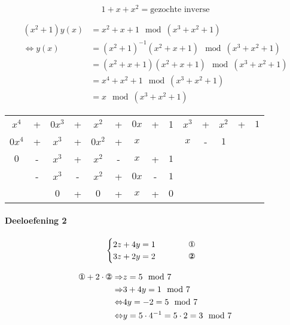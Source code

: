 \documentclass[12pt]{article}
\begin{document}
	\begin{equation}
		1+x+x^{2} = \text{gezochte inverse} 
	\end{equation}

	\begin{align}
	(x^{2}+1)y(x) &= x^{2}+x+1 \mod(x^{3}+x^{2}+1) \\
	\Leftrightarrow y(x) &= (x^{2}+1)^{-1} (x^{2}+x+1) \mod(x^{3}+x^{2}+1) \\
	&= (x^{2}+x+1)(x^{2}+x+1) \mod(x^{3}+x^{2}+1) \\
	&= x^{4}+x^{2}+1 \mod(x^{3}+x^{2}+1) \\
	&= x \mod(x^{3}+x^{2}+1)
	\end{align}

	\begin{table}[H]
	\centering
	\begin{tabular}{ccccccccc|ccccc}
		$x^{4}$&+&$0x^{3}$&+&$x^{2}$&+&$0x$&+&1&$x^{3}$&+&$x^{2}$&+&$1$ \\
		\cline{10-14}
		$0x^{4}$&+&$x^{3}$&+&$0x^{2}$&+&$x$& & &$x$&-&$1$& & \\
		\cline{1-9}
		$0$&-&$x^{3}$&+&$x^{2}$&-&$x$&+&$1$   &&&&& \\
		 &-&$x^{3}$&-&$x^{2}$&+&$0x$&-&$1$   &&&&& \\
		\cline{2-9}
		 & &$0$&+&$0$&+&$x$&+&$0$   &&&&& \\
	\end{tabular}
	\end{table}

	\paragraph{Deeloefening 2}

	\begin{equation}
		\begin{cases}
			2z + 4y = 1 \qquad \qquad \text{\ding{172}} \\
			3z + 2y = 2 \qquad \qquad \text{\ding{173}}
		\end{cases}
	\end{equation}


	\begin{align}
		\text{\ding{172}}+2 \cdot \text{\ding{173}} \Rightarrow & z = 5 \mod 7 \\
		\Rightarrow & 3+4y = 1 \mod 7 \\
		\Leftrightarrow & 4y = -2 = 5 \mod 7 \\
		\Leftrightarrow & y = 5 \cdot 4^{-1} = 5 \cdot 2 = 3 \mod 7
	\end{align}
\end{document}

